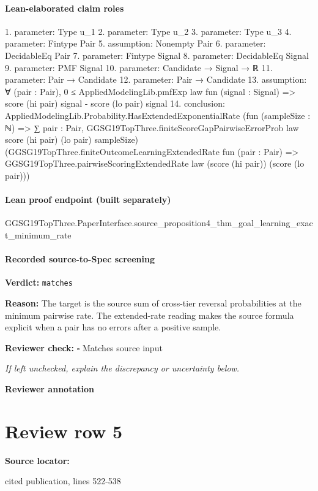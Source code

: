 \documentclass[10pt]{article}
\newcommand{\reviewerbox}{%
  \par\noindent\fbox{\parbox{0.96\linewidth}{\rule{0pt}{0.38in}}}\par
}
\newcommand{\reviewmatch}[1]{%
  \par\noindent\textbf{Reviewer check:} $\square$\; #1\par
  \noindent\emph{If left unchecked, explain the discrepancy or uncertainty below.}\par
}
\begin{document}
\paragraph{Lean-elaborated claim roles}\begin{ReviewVerbatim}
1. parameter: Type u_1
2. parameter: Type u_2
3. parameter: Type u_3
4. parameter: Fintype Pair
5. assumption: Nonempty Pair
6. parameter: DecidableEq Pair
7. parameter: Fintype Signal
8. parameter: DecidableEq Signal
9. parameter: PMF Signal
10. parameter: Candidate → Signal → ℝ
11. parameter: Pair → Candidate
12. parameter: Pair → Candidate
13. assumption: ∀ (pair : Pair),
  0 ≤ AppliedModelingLib.pmfExp law fun (signal : Signal) => score (hi pair) signal - score (lo pair) signal
14. conclusion: AppliedModelingLib.Probability.HasExtendedExponentialRate
  (fun (sampleSize : ℕ) =>
    ∑ pair : Pair, GGSG19TopThree.finiteScoreGapPairwiseErrorProb law score (hi pair) (lo pair) sampleSize)
  (GGSG19TopThree.finiteOutcomeLearningExtendedRate fun (pair : Pair) =>
    GGSG19TopThree.pairwiseScoringExtendedRate law (score (hi pair)) (score (lo pair)))
\end{ReviewVerbatim}

\paragraph{Lean proof endpoint (built separately)}\begin{ReviewVerbatim}
GGSG19TopThree.PaperInterface.source_proposition4_thm_goal_learning_exact_minimum_rate
\end{ReviewVerbatim}

\paragraph{Recorded source-to-Spec screening}
\textbf{Verdict:} \texttt{matches}
\\
{\raggedright
\textbf{Reason:} The target is the source sum of cross-\allowbreak{}tier reversal probabilities at the minimum pairwise rate.\allowbreak{} The extended-\allowbreak{}rate reading makes the source formula explicit when a pair has no errors after a positive sample.\allowbreak{}
\par}
\reviewmatch{Matches source input}
\noindent\textbf{Reviewer annotation}\par
\reviewerbox
\clearpage
\hypertarget{source-claim-6a7da73327f0abda}{}
\section*{Review row 5}
\textbf{Source locator:} {\footnotesize\raggedright cited publication, lines 522-\allowbreak{}538\par}
\end{document}
